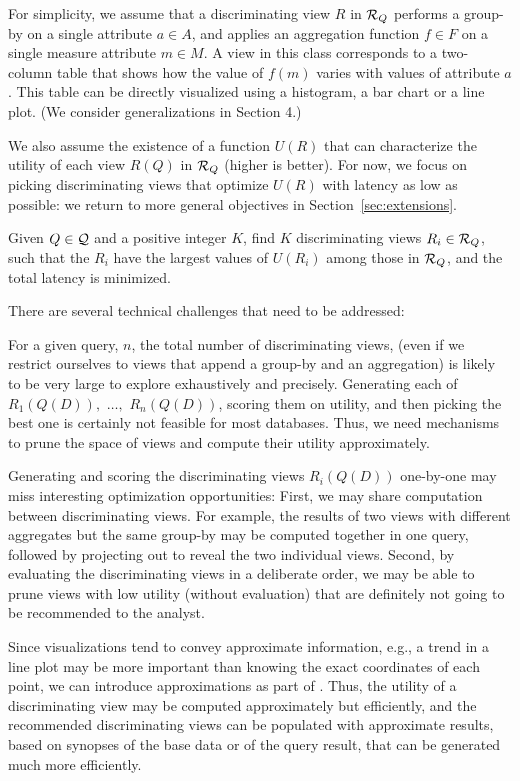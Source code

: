 For simplicity, we assume that a discriminating view 
$R$ in $\mathcal{R}_Q$ performs a group-by on a single attribute $a \in A$, 
and applies an aggregation function $f \in F$ 
on a single measure attribute $m \in M$. 
A view in this class corresponds to a two-column table 
that shows how the value of $f(m)$ varies with values of attribute $a$. 
This table can be directly visualized using a histogram, 
a bar chart or a line plot. (We consider generalizations in Section 4.)

We also assume the existence of a function $U(R)$ that can characterize the
utility of each view $R(Q)$ in $\mathcal{R}_Q$ (higher is better). For now, we focus
on picking discriminating views that optimize $U(R)$ with latency as low as
possible: we return to more general objectives in Section~\ref{sec:extensions}.

Given $Q \in \mathcal{Q}$ and a positive integer $K$, find $K$ discriminating views
$R_i \in \mathcal{R}_Q$, such that the $R_i$ have the largest values of $U(R_i)$ among
those in $\mathcal{R}_Q$, and the total latency is minimized.


\noindent There are several technical challenges that need to be addressed:

\begin{denselist}

\item For a given query, $n$, the total number of discriminating views, (even if
we restrict ourselves to views that append a group-by and an aggregation) is
likely to be very large to explore exhaustively and precisely. Generating each
of $R_1(Q(D)),$  $\ldots,$ $R_n(Q(D))$, scoring them on utility, and then
picking the best one is certainly not feasible for most databases. Thus, we need
mechanisms to prune the space of views and compute their utility approximately.

\item Generating and scoring the discriminating views $R_i(Q(D))$ one-by-one may
miss interesting optimization opportunities: First, we may share computation
between discriminating views.  For example, the results of two views with
different aggregates but the same group-by may be computed together in one
query, followed by projecting out to reveal the two individual views.  Second,
by evaluating the discriminating views in a deliberate order, we may be able to
prune views with low utility (without evaluation) that are definitely not going
to be recommended to the analyst.

\item Since visualizations tend to convey approximate information, e.g., a trend
in a line plot may be more important than knowing the exact coordinates of each
point, we can introduce approximations as part of \SeeDB.  Thus, the utility of
a discriminating view may be computed approximately but efficiently, and the
recommended discriminating views can be populated with approximate results,
based on synopses of the base data or of the query result, that can be generated
much more efficiently.

\end{denselist}



